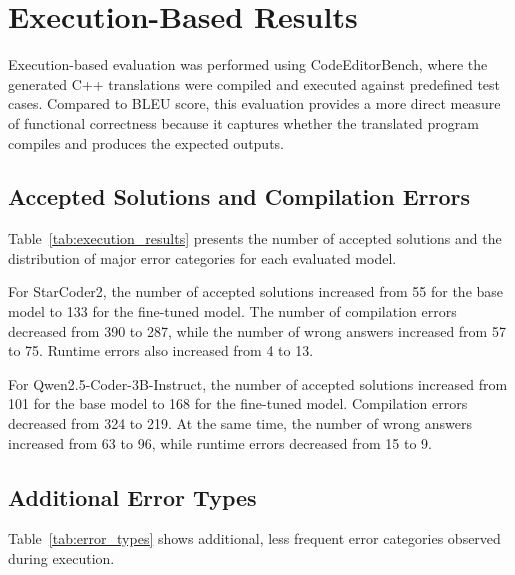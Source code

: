\section{Execution-Based Results}

Execution-based evaluation was performed using CodeEditorBench, where the
generated C++ translations were compiled and executed against predefined test
cases. Compared to BLEU score, this evaluation provides a more direct measure of
functional correctness because it captures whether the translated program
compiles and produces the expected outputs.

\subsection{Accepted Solutions and Compilation Errors}


Table~\ref{tab:execution_results} presents the number of accepted solutions and
the distribution of major error categories for each evaluated model.

For StarCoder2, the number of accepted solutions increased from 55 for the base
model to 133 for the fine-tuned model. The number of compilation errors
decreased from 390 to 287, while the number of wrong answers increased from 57
to 75. Runtime errors also increased from 4 to 13.

For Qwen2.5-Coder-3B-Instruct, the number of accepted solutions increased from
101 for the base model to 168 for the fine-tuned model. Compilation errors
decreased from 324 to 219. At the same time, the number of wrong answers
increased from 63 to 96, while runtime errors decreased from 15 to 9.


\begin{table}[t]
\centering
\caption{Execution-based evaluation results}
\label{tab:execution_results}
\end{table}


\subsection{Additional Error Types}
Table~\ref{tab:error_types} shows additional, less frequent error categories
observed during execution.

